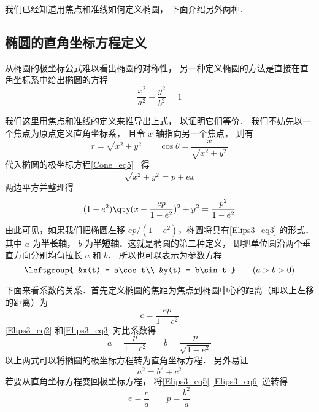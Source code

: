 

我们已经知道用焦点和准线如何定义椭圆， 下面介绍另外两种．

\subsection{椭圆的直角坐标方程定义}
从椭圆的极坐标公式难以看出椭圆的对称性， 另一种定义椭圆的方法是直接在直角坐标系中给出椭圆的方程
\begin{equation}\label{Elips3_eq3}
\frac{x^2}{a^2} + \frac{y^2}{b^2} = 1
\end{equation}

我们这里用焦点和准线的定义来推导出上式， 以证明它们等价． 我们不妨先以一个焦点为原点定义直角坐标系， 且令 $x$ 轴指向另一个焦点， 则有
\begin{equation}
r = \sqrt{x^2 + y^2} \qquad \cos\theta = \frac{x}{\sqrt{x^2 + y^2}}
\end{equation}
代入椭圆的极坐标方程\autoref{Cone_eq5}~ 得
\begin{equation}
\sqrt{x^2 + y^2} = p + ex
\end{equation}
两边平方并整理得
\begin{equation}\label{Elips3_eq2}
(1 - e^2) \qty( x - \frac{ep}{1 - e^2} )^2 + y^2 = \frac{p^2}{1 - e^2}
\end{equation}
由此可见，如果我们把椭圆左移 $ep/(1 - e^2)$，椭圆将具有\autoref{Elips3_eq3} 的形式． 其中 $a$ 为\textbf{半长轴}， $b$ 为\textbf{半短轴}．这就是椭圆的第二种定义， 即把单位圆沿两个垂直方向分别均匀拉长 $a$ 和 $b$． 所以也可以表示为参数方程
\begin{equation}\label{Elips3_eq1}
\leftgroup{
&x(t) = a\cos t\\
&y(t) = b\sin t
} \qquad
(a > b > 0)
\end{equation}

下面来看系数的关系．首先定义椭圆的焦距为焦点到椭圆中心的距离（即以上左移的距离）为
\begin{equation}\label{Elips3_eq5}
c = \frac{ep}{1 - e^2}
\end{equation}
\autoref{Elips3_eq2} 和\autoref{Elips3_eq3} 对比系数得
\begin{equation}\label{Elips3_eq6}
a = \frac{p}{1 - e^2} \qquad b = \frac{p}{\sqrt {1 - e^2} }
\end{equation}
以上两式可以将椭圆的极坐标方程转为直角坐标方程． 另外易证
\begin{equation}\label{Elips3_eq7}
a^2 = b^2 + c^2
\end{equation}
若要从直角坐标方程变回极坐标方程， 将\autoref{Elips3_eq5} \autoref{Elips3_eq6} 逆转得
\begin{equation}\label{Elips3_eq8}
e = \frac{c}{a}\qquad
p = \frac{b^2}{a}
\end{equation}

